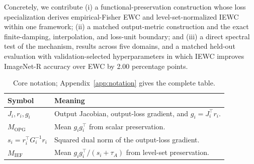 Concretely, we contribute (i) a functional-preservation construction whose loss specialization derives empirical-Fisher EWC and level-set-normalized IEWC within one framework; (ii) a matched output-metric construction and the exact finite-damping, interpolation, and loss-unit boundary; and (iii) a direct spectral test of the mechanism, results across five domains, and a matched held-out evaluation with validation-selected hyperparameters in which IEWC improves ImageNet-R accuracy over EWC by 2.00 percentage points.

\begin{table}[t]
\caption{Core notation; Appendix~\ref{app:notation} gives the complete table.}
\label{tab:core-notation}
\centering
\small
\begin{tabular}{@{}lp{}@{}}
\toprule
Symbol & Meaning \\
\midrule
$J_i,r_i,g_i$ & Output Jacobian, output-loss gradient, and $g_i=J_i^\top r_i$. \\
$M_{\mathrm{OPG}}$ & Mean $g_i g_i^\top$ from scalar preservation. \\
$s_i=r_i^\top G_i^{-1}r_i$ & Squared dual norm of the output-loss gradient. \\
$M_{\mathrm{IEF}}$ & Mean $g_i g_i^\top/(s_i+\tau_A)$ from level-set preservation. \\
\bottomrule
\end{tabular}
\end{table}
